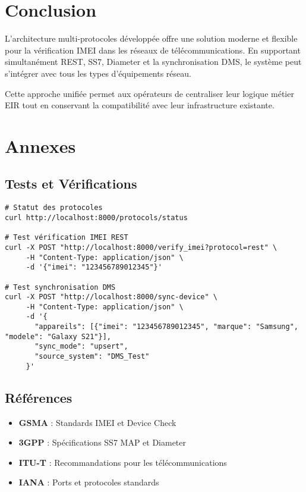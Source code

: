 \documentclass[11pt]{article}
\begin{document}
\section{Conclusion}

L'architecture multi-protocoles développée offre une solution moderne et flexible pour la vérification IMEI dans les réseaux de télécommunications. En supportant simultanément REST, SS7, Diameter et la synchronisation DMS, le système peut s'intégrer avec tous les types d'équipements réseau.

Cette approche unifiée permet aux opérateurs de centraliser leur logique métier EIR tout en conservant la compatibilité avec leur infrastructure existante.

\section{Annexes}

\subsection{Tests et Vérifications}

\begin{lstlisting}[caption=Commandes de Test]
# Statut des protocoles
curl http://localhost:8000/protocols/status

# Test vérification IMEI REST
curl -X POST "http://localhost:8000/verify_imei?protocol=rest" \
     -H "Content-Type: application/json" \
     -d '{"imei": "123456789012345"}'

# Test synchronisation DMS
curl -X POST "http://localhost:8000/sync-device" \
     -H "Content-Type: application/json" \
     -d '{
       "appareils": [{"imei": "123456789012345", "marque": "Samsung", "modele": "Galaxy S21"}],
       "sync_mode": "upsert",
       "source_system": "DMS_Test"
     }'
\end{lstlisting}

\subsection{Références}

\begin{itemize}
    \item \textbf{GSMA} : Standards IMEI et Device Check
    \item \textbf{3GPP} : Spécifications SS7 MAP et Diameter
    \item \textbf{ITU-T} : Recommandations pour les télécommunications
    \item \textbf{IANA} : Ports et protocoles standards
\end{itemize}
\end{document}
